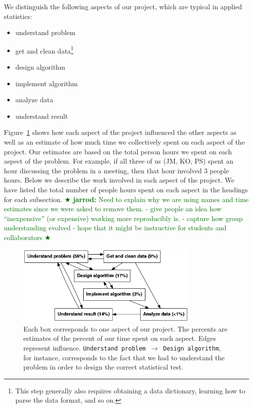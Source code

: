 \documentclass[]{article}
\newcommand{\jarrod}[1] { \textcolor{darkgreen} {
\ensuremath{\bigstar} {\bf jarrod:}  {#1}
\ensuremath{\bigstar} } }
\begin{document}
We distinguish the following aspects of our project, which are typical in applied statistics:
\begin{itemize}
    \item understand problem
    \item get and clean data\footnote{
        This step generally also requires obtaining a data dictionary, learning how to parse
        the data format, and so on.
        }
    \item design algorithm
    \item implement algorithm
    \item analyze data
    \item understand result
\end{itemize}
Figure~\ref{fig:work_process} shows how each aspect of the
project influenced the other aspects as well as an estimate of how much time
we collectively spent on each aspect of the project.
Our estimates are based on the total person hours we spent on each aspect of
the problem.
For example, if all three of us (JM, KO, PS) spent an hour discussing the
problem in a meeting, then that hour involved 3 people hours.
Below we describe the work involved in each aspect of the project.
We have listed the total number of people hours spent on each aspect in the
headings for each subsection.
\jarrod{Need to explain why we are using names and time estimates since
we were asked to remove them.
- give people an idea how ``inexpensive'' (or expensive) working more
  reproducibly is.
- capture how group understanding evolved
- hope that it might be instructive for students and collaborators
}

\begin{figure}[h]
  \centering
    \includegraphics[width=0.8\textwidth]{_fig/work_process.png}
  \caption{
  \small
    Each box corresponds to one aspect of our project.
    The percents are estimates of the percent of our time spent on each aspect.
    Edges represent influence.
    \texttt{Understand problem}~$\to$~\texttt{Design algorithm}, for instance,
    corresponds to the fact that we had to understand the problem in order to
    design the correct statistical test.\label{fig:work_process}}
\end{figure}
\end{document}
